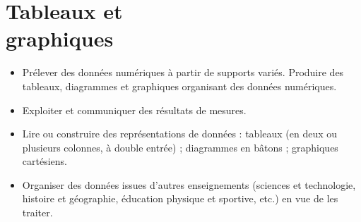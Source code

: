 \themaN
\graphicspath{{../Ch11_Tableaux_et_diagrammes/Images/}}

\chapter{Tableaux et\\graphiques}
\label{C26}


\begin{prerequis}
   \begin{itemize}
      \item Prélever des données numériques à partir de supports variés. Produire des tableaux, diagrammes et graphiques organisant des données numériques.
      \item Exploiter et communiquer des résultats de mesures.
      \item Lire ou construire des représentations de données : tableaux (en deux ou plusieurs colonnes, à double entrée) ; diagrammes en bâtons ; graphiques cartésiens.
      \item Organiser des données issues d’autres enseignements (sciences et technologie, histoire et géographie, éducation physique et sportive, etc.) en vue de les traiter.
   \end{itemize}
\end{prerequis}

\vfill

